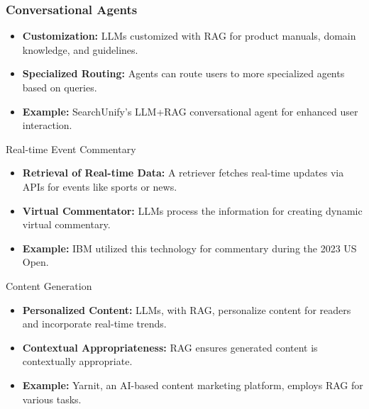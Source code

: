 \begin{frame}[fragile]\frametitle{Conversational Agents}

\begin{itemize}
  \item \textbf{Customization:} LLMs customized with RAG for product manuals, domain knowledge, and guidelines.
  
  \item \textbf{Specialized Routing:} Agents can route users to more specialized agents based on queries.
  
  \item \textbf{Example:} SearchUnify's LLM+RAG conversational agent for enhanced user interaction.
\end{itemize}

\end{frame}

\begin{frame}[fragile]{Real-time Event Commentary}

\begin{itemize}
  \item \textbf{Retrieval of Real-time Data:} A retriever fetches real-time updates via APIs for events like sports or news.
  
  \item \textbf{Virtual Commentator:} LLMs process the information for creating dynamic virtual commentary.
  
  \item \textbf{Example:} IBM utilized this technology for commentary during the 2023 US Open.
\end{itemize}

\end{frame}

\begin{frame}[fragile]{Content Generation}

\begin{itemize}
  \item \textbf{Personalized Content:} LLMs, with RAG, personalize content for readers and incorporate real-time trends.
  
  \item \textbf{Contextual Appropriateness:} RAG ensures generated content is contextually appropriate.
  
  \item \textbf{Example:} Yarnit, an AI-based content marketing platform, employs RAG for various tasks.
\end{itemize}

\end{frame}

